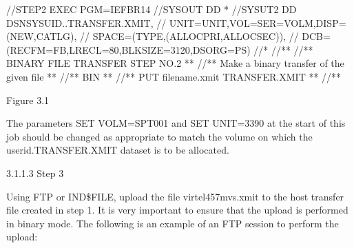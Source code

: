 \documentclass[letterpaper,10pt,english]{sphinxmanual}
\begin{document}
\begin{sphinxVerbatim}[commandchars=\\\{\}]
//STEP2 EXEC PGM=IEFBR14
//SYSOUT DD *
//SYSUT2 DD DSN\PYGZam{}SYSUID..TRANSFER.XMIT,
// UNIT=\PYGZam{}UNIT,VOL=SER=\PYGZam{}VOLM,DISP=(NEW,CATLG),
// SPACE=(\PYGZam{}TYPE,(\PYGZam{}ALLOCPRI,\PYGZam{}ALLOCSEC)),
// DCB=(RECFM=FB,LRECL=80,BLKSIZE=3120,DSORG=PS)
//*
//*\PYGZhy{}\PYGZhy{}\PYGZhy{}\PYGZhy{}\PYGZhy{}\PYGZhy{}\PYGZhy{}\PYGZhy{}\PYGZhy{}\PYGZhy{}\PYGZhy{}\PYGZhy{}\PYGZhy{}\PYGZhy{}\PYGZhy{}\PYGZhy{}\PYGZhy{}\PYGZhy{}\PYGZhy{}\PYGZhy{}\PYGZhy{}\PYGZhy{}\PYGZhy{}\PYGZhy{}\PYGZhy{}\PYGZhy{}\PYGZhy{}\PYGZhy{}\PYGZhy{}\PYGZhy{}\PYGZhy{}\PYGZhy{}\PYGZhy{}\PYGZhy{}\PYGZhy{}\PYGZhy{}\PYGZhy{}\PYGZhy{}\PYGZhy{}\PYGZhy{}\PYGZhy{}\PYGZhy{}\PYGZhy{}\PYGZhy{}\PYGZhy{}\PYGZhy{}\PYGZhy{}\PYGZhy{}\PYGZhy{}\PYGZhy{}\PYGZhy{}\PYGZhy{}\PYGZhy{}\PYGZhy{}\PYGZhy{}\PYGZhy{}\PYGZhy{}\PYGZhy{}\PYGZhy{}\PYGZhy{}\PYGZhy{}\PYGZhy{}\PYGZhy{}\PYGZhy{}\PYGZhy{}\PYGZhy{}\PYGZhy{}*
//*\PYGZhy{}\PYGZhy{}* BINARY FILE TRANSFER \PYGZhy{} STEP NO.2                            *\PYGZhy{}\PYGZhy{}*
//*\PYGZhy{}\PYGZhy{}* Make a binary transfer of the given file                    *\PYGZhy{}\PYGZhy{}*
//*\PYGZhy{}\PYGZhy{}* BIN                                                         *\PYGZhy{}\PYGZhy{}*
//*\PYGZhy{}\PYGZhy{}* PUT filename.xmit TRANSFER.XMIT                             *\PYGZhy{}\PYGZhy{}*
//*\PYGZhy{}\PYGZhy{}\PYGZhy{}\PYGZhy{}\PYGZhy{}\PYGZhy{}\PYGZhy{}\PYGZhy{}\PYGZhy{}\PYGZhy{}\PYGZhy{}\PYGZhy{}\PYGZhy{}\PYGZhy{}\PYGZhy{}\PYGZhy{}\PYGZhy{}\PYGZhy{}\PYGZhy{}\PYGZhy{}\PYGZhy{}\PYGZhy{}\PYGZhy{}\PYGZhy{}\PYGZhy{}\PYGZhy{}\PYGZhy{}\PYGZhy{}\PYGZhy{}\PYGZhy{}\PYGZhy{}\PYGZhy{}\PYGZhy{}\PYGZhy{}\PYGZhy{}\PYGZhy{}\PYGZhy{}\PYGZhy{}\PYGZhy{}\PYGZhy{}\PYGZhy{}\PYGZhy{}\PYGZhy{}\PYGZhy{}\PYGZhy{}\PYGZhy{}\PYGZhy{}\PYGZhy{}\PYGZhy{}\PYGZhy{}\PYGZhy{}\PYGZhy{}\PYGZhy{}\PYGZhy{}\PYGZhy{}\PYGZhy{}\PYGZhy{}\PYGZhy{}\PYGZhy{}\PYGZhy{}\PYGZhy{}\PYGZhy{}\PYGZhy{}\PYGZhy{}\PYGZhy{}\PYGZhy{}\PYGZhy{}*
\end{sphinxVerbatim}

Figure 3.1 

The parameters SET VOLM=SPT001 and SET UNIT=3390 at the start of this job should be changed as appropriate to match the volume on which the userid.TRANSFER.XMIT dataset is to be allocated.

3.1.1.3 Step 3

Using FTP or IND\$FILE, upload the file virtel457mvs.xmit to the host transfer file created in step 1. It is very important to ensure that the upload is performed in binary mode. The following is an example of an FTP session to perform the upload:
\end{document}
